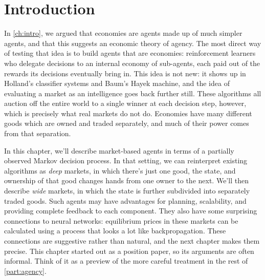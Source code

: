 \section{Introduction}\label{mba:sec:intro}
\begin{draftblock}
In \cref{ch:intro}, we argued that economies are agents made up of much simpler agents, and that this suggests an economic theory of agency. The most direct way of testing that idea is to build agents that are economies: reinforcement learners who delegate decisions to an internal economy of sub-agents, each paid out of the rewards its decisions eventually bring in. This idea is not new: it shows up in Holland's classifier systems and Baum's Hayek machine, and the idea of evaluating a market as an intelligence goes back further still. These algorithms all auction off the entire world to a single winner at each decision step, however, which is precisely what real markets do not do. Economies have many different goods which are owned and traded separately, and much of their power comes from that separation.

In this chapter, we'll describe market-based agents in terms of a partially observed Markov decision process. In that setting, we can reinterpret existing algorithms as \emph{deep} markets, in which there's just one good, the state, and ownership of that good changes hands from one owner to the next. We'll then describe \emph{wide} markets, in which the state is further subdivided into separately traded goods. Such agents may have advantages for planning, scalability, and providing complete feedback to each component. They also have some surprising connections to neural networks: equilibrium prices in these markets can be calculated using a process that looks a lot like backpropagation. These connections are suggestive rather than natural, and the next chapter makes them precise. This chapter started out as a position paper, so its arguments are often informal. Think of it as a preview of the more careful treatment in the rest of \cref{part:agency}.
\end{draftblock}



